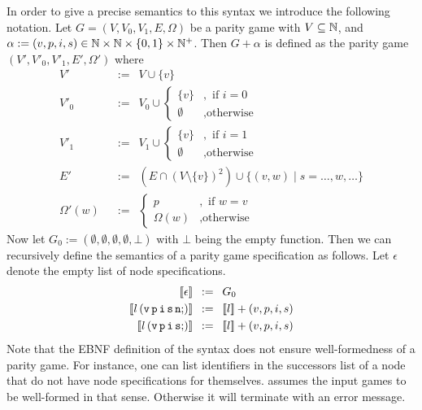 In order to give a precise semantics to this syntax we introduce the following notation. Let
$G = (V,V_0,V_1,E,\Omega)$ be a parity game with $V \subseteq \mathbb{N}$, and
$\alpha := (v,p,i,s) \in \mathbb{N} \times \mathbb{N} \times \{0,1\} \times \mathbb{N}^+$. Then $G + \alpha$
is defined as the parity game $(V',V'_0,V'_1,E',\Omega')$ where
\begin{align*}
V' \enspace &:= \enspace V \cup \{v\} \\
V'_0 \enspace &:= \enspace V_0 \cup \begin{cases} \{v\} &, \mbox{ if } i=0 \\
     \emptyset &, \mbox{otherwise} \end{cases} \\
V'_1 \enspace &:= \enspace V_1 \cup \begin{cases} \{v\} &, \mbox{ if } i=1 \\
     \emptyset &, \mbox{otherwise} \end{cases} \\
E' \enspace &:= \enspace (E \cap (V \setminus \{v\})^2) \cup \{ (v,w) \mid s = \ldots,w,\ldots \} \\
\Omega'(w) \enspace &:= \enspace \begin{cases} p &, \mbox{ if } w=v \\
     \Omega(w) &, \mbox{otherwise} \end{cases}
\end{align*}
Now let $G_0 := (\emptyset,\emptyset,\emptyset,\emptyset,\bot)$ with $\bot$ being the empty
function. Then we can recursively define the semantics of a parity game specification as follows.
Let $\epsilon$ denote the empty list of node specifications.
\begin{align*}
\sem{\epsilon} \enspace &:= \enspace G_0 \\
\sem{l\, (\mathtt{v\, p\, i\, s\, n;})} \enspace &:= \enspace \sem{l} + (v,p,i,s) \\
\sem{l\, (\mathtt{v\, p\, i\, s;})} \enspace &:= \enspace \sem{l} + (v,p,i,s) \\
\end{align*}
Note that the EBNF definition of the syntax does not ensure well-formedness of a parity game.
For instance, one can list identifiers in the successors list of a node that do not have node
specifications for themselves. \pgsolver assumes the input games to be well-formed in that sense.
Otherwise it will terminate with an error message.

